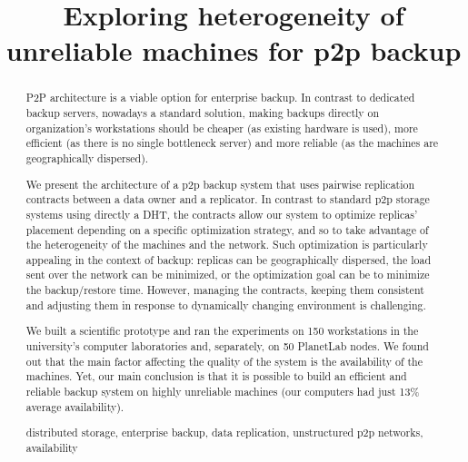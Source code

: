 \documentclass[10pt, final, conference, letterpaper]{IEEEtran}
\begin{document}
\title{Exploring heterogeneity of unreliable machines for p2p backup}


\author{
\and
{}

}

\maketitle



\begin{abstract}
P2P architecture is a viable option for enterprise backup. In contrast to dedicated backup servers, nowadays a standard solution, making backups directly on organization's workstations should be cheaper (as existing hardware is used), more efficient (as there is no single bottleneck server) and more reliable (as the machines are geographically dispersed).

We present the architecture of a p2p backup system that uses pairwise replication contracts between a data owner and a replicator. In contrast to standard p2p storage systems using directly a DHT, the contracts allow our system to optimize replicas' placement depending on a specific optimization strategy,
and so to take advantage of the heterogeneity of the machines and the network. Such optimization is particularly appealing in the context of backup: replicas can be geographically dispersed, the load sent over the network can be minimized, or the optimization goal can be to minimize the backup/restore time.
However, managing the contracts, keeping them consistent and adjusting them in response to dynamically changing environment is challenging.

We built a scientific prototype and ran the experiments on 150 workstations in the university's computer laboratories and, separately, on 50 PlanetLab nodes.
We found out that the main factor affecting the quality of the system is the availability of the machines.
Yet, our main conclusion is that it is possible to build an efficient and reliable backup system on highly unreliable machines (our computers had just 13\% average availability).

\begin{IEEEkeywords}
distributed storage, enterprise backup, data replication, unstructured p2p networks, availability
\end{IEEEkeywords}

\end{abstract}
\end{document}
